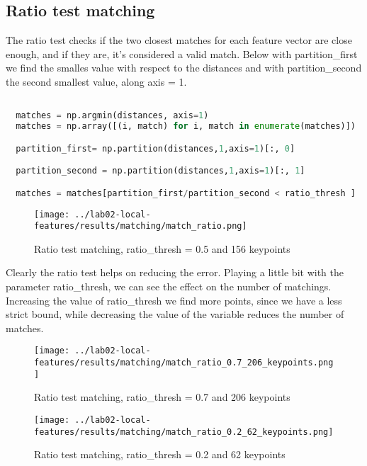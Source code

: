 \documentclass{ETHExercise}
\begin{document}
\subsection{Ratio test matching}
The ratio test checks if the two closest matches for each feature vector 
are close enough, and if they are, it's considered a valid match.
Below with partition\_first we find the smalles value with respect to the 
distances and with partition\_second the second smallest value, along axis = 1.
\begin{lstlisting}[language=Python, caption=Ratio test matching]

  matches = np.argmin(distances, axis=1)
  matches = np.array([(i, match) for i, match in enumerate(matches)])

  partition_first= np.partition(distances,1,axis=1)[:, 0]

  partition_second = np.partition(distances,1,axis=1)[:, 1]

  matches = matches[partition_first/partition_second < ratio_thresh ]
  \end{lstlisting}
\begin{figure}[!h]
  \centering
  \texttt{[image: ../lab02-local-features/results/matching/match\_ratio.png]}
  \caption{Ratio test matching, ratio\_thresh = 0.5 and 156 keypoints}
\end{figure}

Clearly the ratio test helps on reducing the error. Playing a little bit with the parameter ratio\_thresh,
we can see the effect on the number of matchings. Increasing the value of 
ratio\_thresh we find more points, since we have a less strict bound, while decreasing the value
of the variable reduces the number of matches.
\begin{figure}[!h]
  \centering
  \texttt{[image: ../lab02-local-features/results/matching/match\_ratio\_0.7\_206\_keypoints.png]}
  \caption{Ratio test matching, ratio\_thresh = 0.7 and 206 keypoints}
\end{figure}

\begin{figure}[!t]
  \centering
  \texttt{[image: ../lab02-local-features/results/matching/match\_ratio\_0.2\_62\_keypoints.png]}
  \caption{Ratio test matching, ratio\_thresh = 0.2 and 62 keypoints}
\end{figure}
\end{document}

